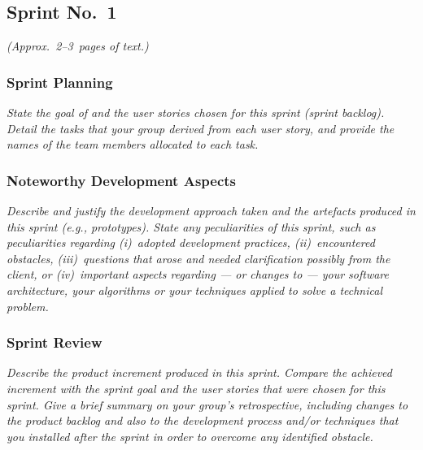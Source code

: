 
\subsection{Sprint No.~1}

\emph{(Approx.~2--3~pages of text.)}

\subsubsection*{Sprint Planning}

\emph{State the goal of and the user stories chosen for this sprint (sprint backlog). Detail the tasks that your group derived from each user story, and provide the names of the team members allocated to each task.}

\subsubsection*{Noteworthy Development Aspects}

\emph{Describe and justify the development approach taken and the artefacts produced in this sprint (e.g., prototypes).  State any peculiarities of this sprint, such as peculiarities  regarding (i)~adopted development practices, (ii)~encountered obstacles, (iii)~questions that arose and needed clarification possibly from the client, or (iv)~important aspects regarding --- or changes to --- your software architecture, your algorithms or your techniques applied to solve a technical problem.}

\subsubsection*{Sprint Review}

\emph{Describe the product increment produced in this sprint. Compare the achieved increment with the sprint goal and the user stories that were chosen for this sprint. Give a brief summary on your group's retrospective, including changes to the product backlog and also to the development process and/or techniques that you installed after the sprint in order to overcome any identified obstacle.}
